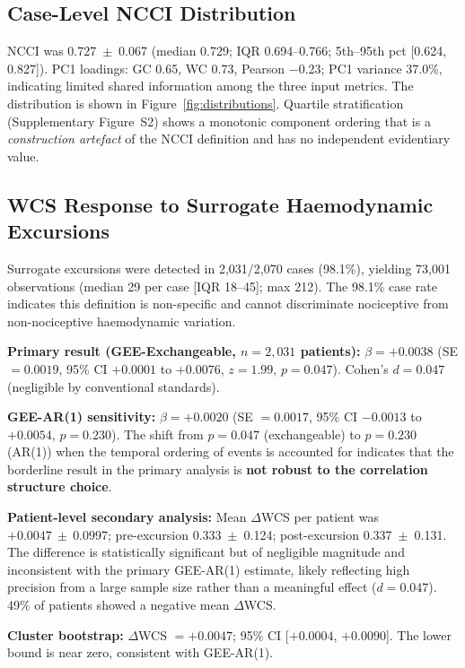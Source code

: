 \documentclass[fleqn,10pt,lineno]{wlpeerj}
\begin{document}
\subsection{Case-Level NCCI Distribution}

NCCI was 0.727~$\pm$~0.067 (median 0.729; IQR 0.694--0.766; 5th--95th pct [0.624, 0.827]).
PC1 loadings: GC 0.65, WC 0.73, Pearson $-$0.23; PC1 variance 37.0\%, indicating limited
shared information among the three input metrics. The distribution is shown in
Figure~\ref{fig:distributions}. Quartile stratification (Supplementary Figure~S2)
shows a monotonic component ordering that is a \textit{construction artefact} of the NCCI
definition and has no independent evidentiary value.

\subsection{WCS Response to Surrogate Haemodynamic Excursions}

Surrogate excursions were detected in 2,031/2,070 cases (98.1\%), yielding 73,001 observations
(median 29 per case [IQR 18--45]; max 212). The 98.1\% case rate indicates this definition is
non-specific and cannot discriminate nociceptive from non-nociceptive haemodynamic variation.

\textbf{Primary result (GEE-Exchangeable, $n = 2{,}031$ patients):} $\beta = +0.0038$
(SE $= 0.0019$, 95\% CI $+0.0001$ to $+0.0076$, $z = 1.99$, $p = 0.047$). Cohen's
$d = 0.047$ (negligible by conventional standards).

\textbf{GEE-AR(1) sensitivity:} $\beta = +0.0020$ (SE $= 0.0017$, 95\% CI $-0.0013$ to
$+0.0054$, $p = 0.230$). The shift from $p = 0.047$ (exchangeable) to $p = 0.230$ (AR(1))
when the temporal ordering of events is accounted for indicates that the borderline result in
the primary analysis is \textbf{not robust to the correlation structure choice}.

\textbf{Patient-level secondary analysis:} Mean $\Delta$WCS per patient was
$+0.0047~\pm~0.0997$; pre-excursion 0.333~$\pm$~0.124; post-excursion 0.337~$\pm$~0.131.
The difference is statistically significant but of negligible magnitude and inconsistent with
the primary GEE-AR(1) estimate, likely reflecting high precision from a large sample size
rather than a meaningful effect ($d = 0.047$). 49\% of patients showed a negative mean
$\Delta$WCS.

\textbf{Cluster bootstrap:} $\Delta$WCS $= +0.0047$; 95\% CI [$+0.0004$, $+0.0090$]. The
lower bound is near zero, consistent with GEE-AR(1).
\end{document}
